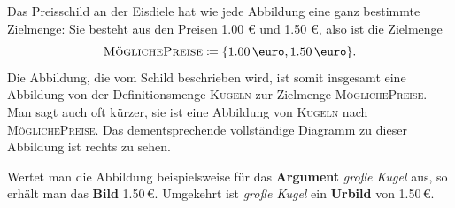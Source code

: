\documentclass[../../main.tex]{subfiles}
\begin{document}
\pagebreak
\begin{example}{}
    Das Preisschild an der Eisdiele hat wie jede Abbildung eine ganz bestimmte Zielmenge: Sie besteht aus den Preisen 1.00 \euro{} und 1.50 \euro, also ist die Zielmenge \[\textsc{MöglichePreise}\coloneqq\{\text{1.00\,\euro},\text{1.50\,\euro}\}.\]
    Die Abbildung, die vom Schild beschrieben wird, ist somit insgesamt eine Abbildung von der Definitionsmenge \textsc{Kugeln} zur Zielmenge \textsc{MöglichePreise}. Man sagt auch oft kürzer, sie ist eine Abbildung von \textsc{Kugeln} nach \textsc{MöglichePreise}. Das dementsprechende vollständige Diagramm zu dieser Abbildung ist rechts zu sehen.
    
    Wertet man die Abbildung beispielsweise für das \textbf{Argument} \emph{große Kugel} aus, so erhält man das \textbf{Bild} 1.50\,\euro. Umgekehrt ist \emph{große Kugel} ein \textbf{Urbild} von 1.50\,\euro.
\end{example}
\end{document}
